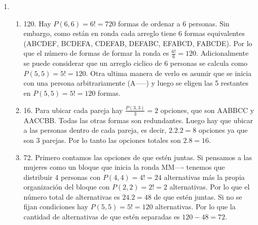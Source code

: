\documentclass[a4paper]{article}
\newcommand{\exercise}{\item}
\begin{document}
\begin{enumerate}
\begin{enumerate} [label=(\alph*)]
		\item 8400. En la última cifra hay 5 opciones (1,3,5,7,9). Luego, queda definir las 4 cifras restantes con los 8 digitos que quedan, es decir, $P(8,4)=\frac{8!}{4!}=8.7.6.5=1680$ opciones. El total de opciones será $5.1680=8400$
		\item 2520. Primero definimos las dos primeras cifras a partir de los 4 dígitos pares (2,4,6,8), es decir, $4.3=12$ opciones. Luego definimos las 3 cifras restantes con los 7 digitos que quedan, es decir, $P(7,3)=\frac{7!}{4!}=7.6.5=210$ opciones. El total de opciones será $12.210=2520$.
		\item 264. Para que la suma de las cifras de par hay varias opciones: todas ellas deben ser pares (con $4.3.2=24$ opciones), sólo la primera cifra debe ser par (con $4.5.4=80$ opciones), sólo la segunda debe ser par (con $5.4.4=80$ opciones), o sólo la última debe ser par (con $5.4.4=80$ opciones). El total de opciones es $24+80+80+80=264$.
		\item 24. Hay 2 opciones, que el número sea 2---- o 7----. Para el primer caso hay $\frac{P(4,4)}{2!}=\frac{4!}{2!}=12$ opciones ya que el 7 está repetido. Para el segundo caso hay $\frac{P(4,4)}{2!}=\frac{4!}{2!}=12$ opciones ya que el 2 está repetido. El total de opciones es $12+12=24$.
		\item 512. Hay 8 opciones para cada cifra, por lo que el total de opciones es $8.8.8=8^3=512$, o bien es una permutación con reposición $P^R(8,3)=8^3=512$.
\end{enumerate}\exercise\begin{enumerate} [label=(\alph*)]		\item 120. Hay $P(6,6)=6!=720$ formas de ordenar a 6 personas. Sin embargo, como están en ronda cada arreglo tiene 6 formas equivalentes (ABCDEF, BCDEFA, CDEFAB, DEFABC, EFABCD, FABCDE). Por lo que el número de formas de formar la ronda es $\frac{6!}{6}=120$. Adicionalmente se puede considerar que un arreglo ciclico de 6 personas se calcula como $P(5,5)=5!=120$. Otra ultima manera de verlo es asumir que se inicia con una persona arbitrariamente (A-----) y luego se eligen las 5 restantes en $P(5,5)=5!=120$ formas.
		\item 16. Para ubicar cada pareja hay $\frac{P(3,3)}{3}=2$ opciones, que son AABBCC y AACCBB. Todas las otras formas son redundantes. Luego hay que ubicar a las personas dentro de cada pareja, es decir, $2.2.2=8$ opciones ya que son 3 parejas. Por lo tanto las opciones totales son $2.8=16$.
		\item 72. Primero contamos las opciones de que estén juntas. Si pensamos a las mujeres como un bloque que inicia la ronda MM---- tenemos que distribuir 4 personas con $P(4,4)=4!=24$ alternativas más la propia organización del bloque con $P(2,2)=2!=2$ alternativas. Por lo que el número total de alternativas es $24.2=48$ de que estén juntas. Si no se fijan condiciones hay $P(5,5)=5!=120$ alternativas. Por lo que la cantidad de alternativas de que estén separadas es $120-48=72$.

\end{enumerate}
\end{enumerate}
\end{document}
